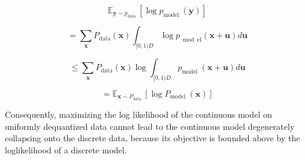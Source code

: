\documentclass[]{IEEEtran}
\begin{document}
\begin{equation}
\mathbb{E}_{\mathbf{y} \sim p_{\text {data }}}\left[\log p_{\text {model }}(\mathbf{y})\right]
\label{fpp03}
\end{equation}

\begin{equation}
=\sum_{\mathbf{x}} P_{\operatorname{data}}(\mathbf{x}) \int_{[0,1) D} \log p_{\bmod \mathrm{el}}(\mathbf{x}+\mathbf{u}) d \mathbf{u}
\label{fpp04}
\end{equation}

\begin{equation}
\leq \sum_{\mathbf{x}} P_{\operatorname{data}}(\mathbf{x}) \log \int_{[0,1) D} p_{\text {model }}(\mathbf{x}+\mathbf{u}) d \mathbf{u}
\label{fpp05}
\end{equation}

\begin{equation}
=\mathbb{E}_{\mathbf{x} \sim P_{\text {data }}}\left[\log P_{\text {model }}(\mathbf{x})\right]
\label{fpp06}
\end{equation}

Consequently, maximizing the log likelihood of the continuous model on uniformly dequantized data cannot lead to the continuous model degenerately collapsing onto the discrete data, because its objective is bounded above by the loglikelihood of a discrete model. 
\end{document}
